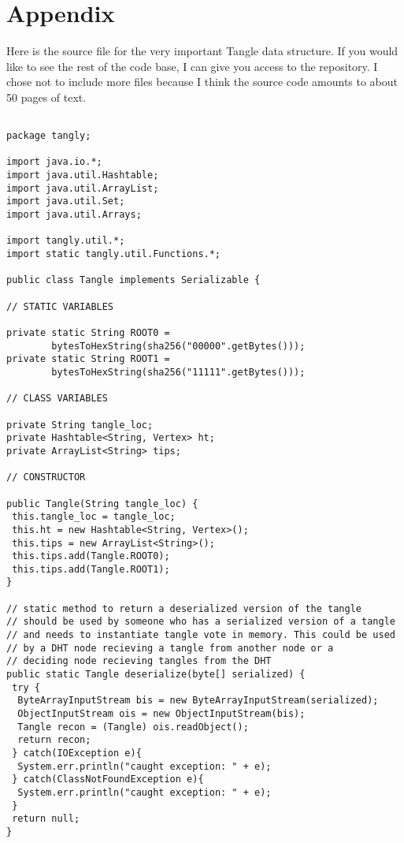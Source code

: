 \section{Appendix}
\label{sec:appendix}

Here is the source file for the very important Tangle data structure.
If you would like to see the rest of the code base, I can give you access to the repository.
I chose not to include more files because I think the source code amounts to about 50 pages of text.

\begin{Verbatim}

package tangly;

import java.io.*;
import java.util.Hashtable;
import java.util.ArrayList;
import java.util.Set;
import java.util.Arrays;

import tangly.util.*;
import static tangly.util.Functions.*;

public class Tangle implements Serializable {

// STATIC VARIABLES

private static String ROOT0 = 
        bytesToHexString(sha256("00000".getBytes()));	
private static String ROOT1 = 
        bytesToHexString(sha256("11111".getBytes()));

// CLASS VARIABLES

private String tangle_loc;
private Hashtable<String, Vertex> ht;
private ArrayList<String> tips;

// CONSTRUCTOR

public Tangle(String tangle_loc) {
 this.tangle_loc = tangle_loc;
 this.ht = new Hashtable<String, Vertex>();		
 this.tips = new ArrayList<String>();	
 this.tips.add(Tangle.ROOT0);
 this.tips.add(Tangle.ROOT1);
}

// static method to return a deserialized version of the tangle
// should be used by someone who has a serialized version of a tangle
// and needs to instantiate tangle vote in memory. This could be used
// by a DHT node recieving a tangle from another node or a 
// deciding node recieving tangles from the DHT
public static Tangle deserialize(byte[] serialized) {
 try {
  ByteArrayInputStream bis = new ByteArrayInputStream(serialized);
  ObjectInputStream ois = new ObjectInputStream(bis);
  Tangle recon = (Tangle) ois.readObject();
  return recon;
 } catch(IOException e){ 
  System.err.println("caught exception: " + e);
 } catch(ClassNotFoundException e){
  System.err.println("caught exception: " + e);
 }
 return null;
}


\end{Verbatim}
